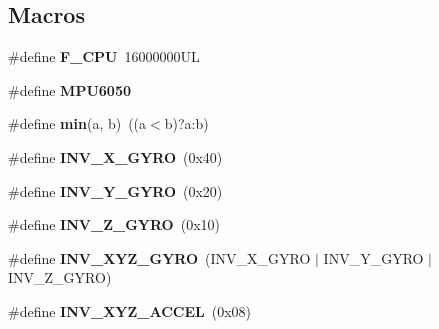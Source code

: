 \subsection*{Macros}
\begin{DoxyCompactItemize}
\item 
\#define {\bfseries F\+\_\+\+C\+PU}~16000000\+UL\hypertarget{group___d_r_i_v_e_r_s_ga43bafb28b29491ec7f871319b5a3b2f8}{}\label{group___d_r_i_v_e_r_s_ga43bafb28b29491ec7f871319b5a3b2f8}

\item 
\#define {\bfseries M\+P\+U6050}\hypertarget{group___d_r_i_v_e_r_s_ga6d132f914f18cb144a0eaf36312045c8}{}\label{group___d_r_i_v_e_r_s_ga6d132f914f18cb144a0eaf36312045c8}

\item 
\#define {\bfseries min}(a,  b)~((a$<$b)?a\+:b)\hypertarget{group___d_r_i_v_e_r_s_gac6afabdc09a49a433ee19d8a9486056d}{}\label{group___d_r_i_v_e_r_s_gac6afabdc09a49a433ee19d8a9486056d}

\item 
\#define {\bfseries I\+N\+V\+\_\+\+X\+\_\+\+G\+Y\+RO}~(0x40)\hypertarget{group___d_r_i_v_e_r_s_gabf02bf28541421d59f8be764f2b95407}{}\label{group___d_r_i_v_e_r_s_gabf02bf28541421d59f8be764f2b95407}

\item 
\#define {\bfseries I\+N\+V\+\_\+\+Y\+\_\+\+G\+Y\+RO}~(0x20)\hypertarget{group___d_r_i_v_e_r_s_gacdd8ff833a34dba08ca2aa145eb92b44}{}\label{group___d_r_i_v_e_r_s_gacdd8ff833a34dba08ca2aa145eb92b44}

\item 
\#define {\bfseries I\+N\+V\+\_\+\+Z\+\_\+\+G\+Y\+RO}~(0x10)\hypertarget{group___d_r_i_v_e_r_s_ga50205b5cc6089b33b2561c854eb8b0fd}{}\label{group___d_r_i_v_e_r_s_ga50205b5cc6089b33b2561c854eb8b0fd}

\item 
\#define {\bfseries I\+N\+V\+\_\+\+X\+Y\+Z\+\_\+\+G\+Y\+RO}~(I\+N\+V\+\_\+\+X\+\_\+\+G\+Y\+RO $\vert$ I\+N\+V\+\_\+\+Y\+\_\+\+G\+Y\+RO $\vert$ I\+N\+V\+\_\+\+Z\+\_\+\+G\+Y\+RO)\hypertarget{group___d_r_i_v_e_r_s_ga3fdc30f9c0a26c2c4e2bb88921f91629}{}\label{group___d_r_i_v_e_r_s_ga3fdc30f9c0a26c2c4e2bb88921f91629}

\item 
\#define {\bfseries I\+N\+V\+\_\+\+X\+Y\+Z\+\_\+\+A\+C\+C\+EL}~(0x08)\hypertarget{group___d_r_i_v_e_r_s_gaa03f025a17ed491e70b88274e89c75c5}{}\label{group___d_r_i_v_e_r_s_gaa03f025a17ed491e70b88274e89c75c5}


\end{DoxyCompactItemize}
